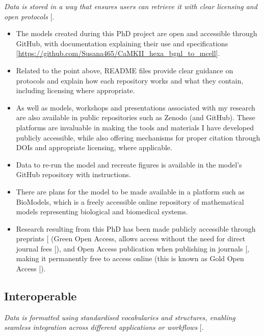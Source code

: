 \documentclass[
  11pt,
  letterpaper,
]{scrreprt}
\providecommand{\tightlist}{%
  \setlength{\itemsep}{0pt}\setlength{\parskip}{0pt}}\usepackage{longtable,booktabs,array}
\begin{document}
\emph{Data is stored in a way that ensures users can retrieve it with
clear licensing and open protocols}
{[}\citeproc{ref-jacobsen2020FAIR}{378}{]}.

\begin{itemize}
\tightlist
\item
  The models created during this PhD project are open and accessible
  through GitHub, with documentation explaining their use and
  specifications
  {[}\url{https://github.com/Susana465/CaMKII_hexa_bgnl_to_mcell}{]}.
\item
  Related to the point above, README files provide clear guidance on
  protocols and explain how each repository works and what they contain,
  including licensing where appropriate.
\item
  As well as models, workshops and presentations associated with my
  research are also available in public repositories such as Zenodo (and
  GitHub). These platforms are invaluable in making the tools and
  materials I have developed publicly accessible, while also offering
  mechanisms for proper citation through DOIs and appropriate licensing,
  where applicable.
\item
  Data to re-run the model and recreate figures is available in the
  model's GitHub repository with instructions.
\item
  There are plans for the model to be made available in a platform such
  as BioModels, which is a freely accessible online repository of
  mathematical models representing biological and biomedical systems.
\item
  Research resulting from this PhD has been made publicly accessible
  through preprints {[}\citeproc{ref-garcia2024Data}{381}{]} (Green Open
  Access, allows access without the need for direct journal fees
  {[}\citeproc{ref-bjork2014Anatomy}{367}{]}), and Open Access
  publication when publishing in journals
  {[}\citeproc{ref-garcia2025Data}{382}{]}, making it permanently free
  to access online (this is known as Gold Open Access
  {[}\citeproc{ref-borrego2023Article}{366}{]}).
\end{itemize}

\subsection{Interoperable}\label{interoperable}

\emph{Data is formatted using standardised vocabularies and structures,
enabling seamless integration across different applications or
workflows} {[}\citeproc{ref-jacobsen2020FAIR}{378}{]}.
\end{document}
